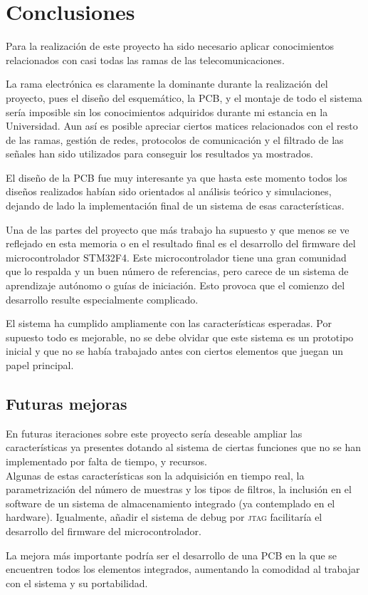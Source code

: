 \chapter{Conclusiones\label{sec:conclusiones}}

Para la realización de este proyecto ha sido necesario aplicar conocimientos relacionados con casi todas las ramas de las telecomunicaciones.

La rama electrónica es claramente la dominante durante la realización del proyecto, pues el diseño del esquemático, la \acrshort{PCB}, y el montaje de todo el sistema sería imposible sin los conocimientos adquiridos durante mi estancia en la Universidad. Aun así es posible apreciar ciertos matices relacionados con el resto de las ramas, gestión de redes, protocolos de comunicación y el filtrado de las señales han sido utilizados para conseguir los resultados ya mostrados.

El diseño de la \acrshort{PCB} fue muy interesante ya que hasta este momento todos los diseños realizados habían sido orientados al análisis teórico y simulaciones, dejando de lado la implementación final de un sistema de esas características.

Una de las partes del proyecto que más trabajo ha supuesto y que menos se ve reflejado en esta memoria o en el resultado final es el desarrollo del firmware del microcontrolador STM32F4. Este microcontrolador tiene una gran comunidad que lo respalda y un buen número de referencias, pero carece de un sistema de aprendizaje autónomo o guías de iniciación. Esto provoca que el comienzo del desarrollo resulte especialmente complicado.

El sistema ha cumplido ampliamente con las características esperadas. Por supuesto todo es mejorable, no se debe olvidar que este sistema es un prototipo inicial y que no se había trabajado antes con ciertos elementos que juegan un papel principal.

\clearpage

\section{Futuras mejoras}

En futuras iteraciones sobre este proyecto sería deseable ampliar las características ya presentes dotando al sistema de ciertas funciones que no se han implementado por falta de tiempo, y recursos.\\
Algunas de estas características son la adquisición en tiempo real, la parametrización del número de muestras y los tipos de filtros, la inclusión en el software de un sistema de almacenamiento integrado (ya contemplado en el hardware). Igualmente, añadir el sistema de debug por \textsc{\acrshort{jtag}} facilitaría el desarrollo del firmware del microcontrolador.

La mejora más importante podría ser el desarrollo de una \acrshort{PCB} en la que se encuentren todos los elementos integrados, aumentando la comodidad al trabajar con el sistema y su portabilidad.


